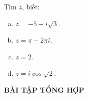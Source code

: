 \begin{bt}%
	Tìm $\overline{z}$, biết:
	\begin{multicols}{2}
		\begin{enumerate}[a.]
			\item $z=-5+i\sqrt{3}$.
			\item $z=\pi-2\pi i$.
			\item $z=2$.
			\item $z=i\cos \sqrt{2}$.
		\end{enumerate}
	\end{multicols}
\end{bt}
\begin{center}
	\textbf{BÀI TẬP TỔNG HỢP}
\end{center}
